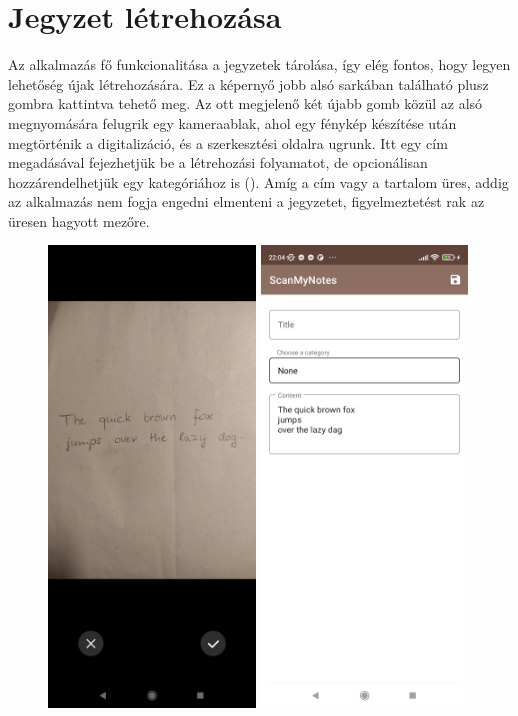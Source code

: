 \section{Jegyzet létrehozása}
Az alkalmazás fő funkcionalitása a jegyzetek tárolása, így elég fontos, hogy legyen lehetőség újak létrehozására. Ez a képernyő jobb alsó sarkában található plusz gombra kattintva tehető meg. Az ott megjelenő két újabb gomb közül az alsó megnyomására felugrik egy kameraablak, ahol egy fénykép készítése után megtörténik a digitalizáció, és a szerkesztési oldalra ugrunk. Itt egy cím megadásával fejezhetjük be a létrehozási folyamatot, de opcionálisan hozzárendelhetjük egy kategóriához is (). Amíg a cím vagy a tartalom üres, addig az alkalmazás nem fogja engedni elmenteni a jegyzetet, figyelmeztetést rak az üresen hagyott mezőre.
\begin{figure}[!ht]
	\centering
	\includegraphics[width=55mm, keepaspectratio]{figures/newnote_photo.jpg}
	\includegraphics[width=55mm, keepaspectratio]{figures/newnote_create.jpg}

\end{figure}

